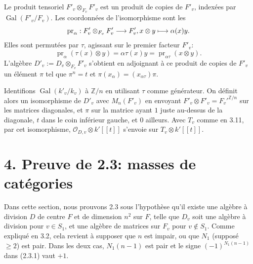 \documentclass[10pt]{article}
\newcommand{\Z}{\mathbb Z}
\newcommand{\Gal}{\operatorname{Gal}}
\theoremstyle{deligne}
\begin{document}
Le produit tensoriel $F'_v\otimes_{F_v}F'_v$ est un produit de copies de $F'_v$, indexées par $\Gal(F'_v/F_v)$. Les coordonnées de l'isomorphisme sont les
\[
\operatorname{pr}_\alpha:F'_v\otimes_{F_v}F'_v\longrightarrow F'_v,\\ x\otimes y\longmapsto\alpha(x)y.
\]
Elles sont permutées par $\tau$, agissant sur le premier facteur $F'_v$:
\[
\operatorname{pr}_\alpha(\tau(x)\otimes y)=\alpha\tau(x)y=\operatorname{pr}_{\alpha\tau}(x\otimes y).
\]
L'algèbre $D'_v:=D_v\otimes_{F_v}F'_v$ s'obtient en adjoignant à ce produit de copies de $F'_v$ un élément $\pi$ tel que $\pi^n=t$ et $\pi(x_\alpha)=(x_{\alpha\tau})\pi$.

Identifions $\Gal(k'_v/k_v)$ à $\Z/n$ en utilisant $\tau$ comme générateur. On définit alors un isomorphisme de $D'_v$ avec $M_n(F'_v)$ en envoyant $F'_v\otimes F'_v=F_v'^{\Z/n}$ sur les matrices diagonales, et $\pi$ sur la matrice ayant $1$ juste au-dessus de la diagonale, $t$ dans le coin inférieur gauche, et $0$ ailleurs. Avec $T_v$ comme en 3.11, par cet isomorphisme, $\mathcal O_{D,v}\otimes k'[[t]]$ s'envoie sur $T_v\otimes k'[[t]]$.

\section*{4. Preuve de 2.3: masses de catégories}

Dans cette section, nous prouvons 2.3 sous l'hypothèse qu'il existe une algèbre à division $D$ de centre $F$ et de dimension $n^2$ sur $F$, telle que $D_v$ soit une algèbre à division pour $v\in S_1$, et une algèbre de matrices sur $F_v$ pour $v\notin S_1$. Comme expliqué en 3.2, cela revient à supposer que $n$ est impair, ou que $N_1$ (supposé $\ge2$) est pair. Dans les deux cas, $N_1(n-1)$ est pair et le signe $(-1)^{N_1(n-1)}$ dans (2.3.1) vaut $+1$.
\end{document}
